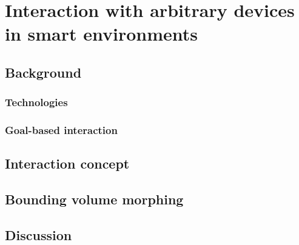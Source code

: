 \chapter{Interaction with arbitrary devices in smart environments}
\label{ch:pointing}
\section{Background}
\subsection{Technologies}
\subsection{Goal-based interaction}
\section{Interaction concept}
\section{Bounding volume morphing}
\section{Discussion}
